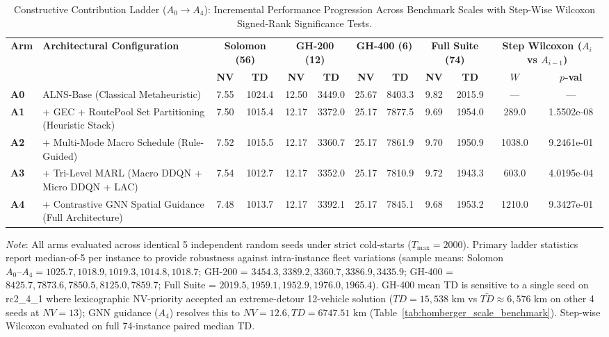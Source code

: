 \begin{table}[!t]
\caption{Constructive Contribution Ladder ($A_0 \to A_4$): Incremental Performance Progression Across Benchmark Scales with Step-Wise Wilcoxon Signed-Rank Significance Tests.}
\label{tab:constructive_ladder}
\centering
\scriptsize
\setlength{\tabcolsep}{2.5pt}
\begin{tabular*}{\textwidth}{@{\extracolsep{\fill}} l l cc cc cc cc cc @{}}
\toprule
\multirow{2}{*}{\textbf{Arm}} & \multirow{2}{*}{\textbf{Architectural Configuration}} & \multicolumn{2}{c}{\textbf{Solomon (56)}} & \multicolumn{2}{c}{\textbf{GH-200 (12)}} & \multicolumn{2}{c}{\textbf{GH-400 (6)}} & \multicolumn{2}{c}{\textbf{Full Suite (74)}} & \multicolumn{2}{c}{\textbf{Step Wilcoxon ($A_i$ vs $A_{i-1}$)}} \\
\cmidrule(lr){3-4} \cmidrule(lr){5-6} \cmidrule(lr){7-8} \cmidrule(lr){9-10} \cmidrule(lr){11-12}
 & & \textbf{NV} & \textbf{TD} & \textbf{NV} & \textbf{TD} & \textbf{NV} & \textbf{TD} & \textbf{NV} & \textbf{TD} & $W$ & $p$\textbf{-val} \\
\midrule
\textbf{A0} & ALNS-Base (Classical Metaheuristic) & 7.55 & 1024.4 & 12.50 & 3449.0 & 25.67 & 8403.3 & 9.82 & 2015.9 & --- & --- \\
\textbf{A1} & + GEC + RoutePool Set Partitioning (Heuristic Stack) & 7.50 & 1015.4 & 12.17 & 3372.0 & 25.17 & 7877.5 & 9.69 & 1954.0 & 289.0 & 1.5502e-08 \\
\textbf{A2} & + Multi-Mode Macro Schedule (Rule-Guided) & 7.52 & 1015.5 & 12.17 & 3360.7 & 25.17 & 7861.9 & 9.70 & 1950.9 & 1038.0 & 9.2461e-01 \\
\textbf{A3} & + Tri-Level MARL (Macro DDQN + Micro DDQN + LAC) & 7.54 & 1012.7 & 12.17 & 3352.0 & 25.17 & 7810.9 & 9.72 & 1943.3 & 603.0 & 4.0195e-04 \\
\textbf{A4} & + Contrastive GNN Spatial Guidance (Full Architecture) & 7.48 & 1013.7 & 12.17 & 3392.1 & 25.17 & 7845.1 & 9.68 & 1953.2 & 1210.0 & 9.3427e-01 \\
\bottomrule
\end{tabular*}
{\raggedright \scriptsize \textit{Note}: All arms evaluated across identical 5 independent random seeds under strict cold-starts ($T_{\max}=2000$). Primary ladder statistics report median-of-5 per instance to provide robustness against intra-instance fleet variations (sample means: Solomon $A_0\text{--}A_4 = 1025.7, 1018.9, 1019.3, 1014.8, 1018.7$; GH-200 = $3454.3, 3389.2, 3360.7, 3386.9, 3435.9$; GH-400 = $8425.7, 7873.6, 7850.5, 8125.0, 7859.7$; Full Suite = $2019.5, 1959.1, 1952.9, 1976.0, 1965.4$). GH-400 mean TD is sensitive to a single seed on rc2\_4\_1 where lexicographic NV-priority accepted an extreme-detour 12-vehicle solution ($TD=15{,}538\text{ km}$ vs $\bar{TD} \approx 6{,}576\text{ km}$ on other 4 seeds at $NV=13$); GNN guidance ($A_4$) resolves this to $NV=12.6, TD=6747.51\text{ km}$ (Table~\ref{tab:homberger_scale_benchmark}). Step-wise Wilcoxon evaluated on full 74-instance paired median TD.\par}
\end{table}
